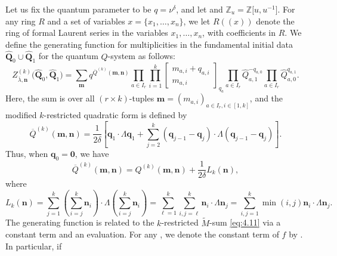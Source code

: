 \documentclass[pdftex]{sigma}
\numberwithin{equation}{section}
\begin{document}
Let us fix the quantum parameter to be $q=\nu^{\delta}$, and let  and $\mathbb{Z}_u= \mathbb{Z}\bigl[u,u^{-1}\bigr]$. For any ring $R$ and a set of variables $x=\{x_1,\dots,x_n\}$, we let $R((x))$ denote the ring of formal Laurent series in the variables $x_1,\dots,x_n$, with coefficients in $R$. We define the generating function for multiplicities
in the fundamental initial data ${\widehat{\mathbf{Q}}_0\cup \widehat{\mathbf{Q}}_1}$ for the quantum $Q$-system as follows:
\begin{equation}\label{eq:4.13}
Z_{\overline{\lambda},\mathbf{n}}^{(k)}\bigl(\widehat{\mathbf{ Q}}_0,\widehat{\mathbf{Q}}_1\bigr)
=\sum_{\mathbf{m}}q^{\overline{Q}^{(k)}(\mathbf{m},\mathbf{ n})} \prod_{a\in I_r}\prod_{i=1}^k\begin{bmatrix}m_{ a,i}+q_{a,i}\\m_{a,i}\end{bmatrix}_{q_a}\prod_{a\in I_r}\widehat{Q}_{a,1}^{-q_{a,0}} \prod_{a\in I_r}\widehat{Q}_{a,0}^{q_{a,1}}.
\end{equation}
Here, the sum is over all $(r\times k)$-tuples $\mathbf{m}=(m_{a,i})_{a\in I_r,i\in[1,k]}$, and the modified $k$-restricted quadratic form  is defined by
\begin{equation*}
\overline{Q}^{(k)}(\mathbf{m},\mathbf{n})
=\frac{1}{2\delta}\left[\mathbf{q}_1\cdot\Lambda\mathbf{q}_1+ \sum_{j=2}^k(\mathbf{q}_{j-1}-\mathbf{q}_j)\cdot\Lambda (\mathbf{q}_{j-1}-\mathbf{q}_j)\right].
\end{equation*}
Thus, when $\mathbf{q}_0=\mathbf{0}$, we have
\begin{equation}\label{eq:4.15}
\overline{Q}^{(k)}(\mathbf{m},\mathbf{n})= Q^{(k)}(\mathbf{m},\mathbf{n})+\frac{1}{2\delta} L_k(\mathbf{n}),
\end{equation}
where
\begin{equation*}
L_k(\mathbf{n})
=\sum_{j=1}^k\left(\sum_{i=j}^k\mathbf{n}_i\right)\cdot\Lambda\left(\sum_{i=j}^k\mathbf{n}_i\right)
=\sum_{\ell=1}^k\sum_{i,j=\ell}^k\mathbf{n}_i\cdot\Lambda\mathbf{n}_j
=\sum_{i,j=1}^k\min(i,j)\mathbf{n}_i\cdot\Lambda\mathbf{n}_j.
\end{equation*}
The generating function  is related to the $k$-restricted $\tilde{M}$-sum  \eqref{eq:4.11} via a constant term and an evaluation. For any , we denote the constant term of $f$ by . In particular, if
\end{document}
